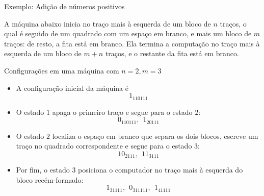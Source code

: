 \begin{frame}[fragile]{Exemplo: Adição de números positivos}

    A máquina abaixo inicia no traço mais à esquerda de um bloco de $n$ traços, o qual é seguido
    de um quadrado com um espaço em branco, e mais um bloco de $m$ traços: de resto, a fita está
    em branco. Ela termina a computação no traço mais à esquerda de um bloco de $m+n$ traços, e 
    o restante da fita está em branco.

    \vspace{0.3in}
    
    \begin{figure}[h]
        \centering
    \end{figure}

\end{frame}

\begin{frame}[fragile]{Configurações em uma máquina com $n=2, m = 3$}

    \begin{itemize}
        \item A configuração inicial da máquina é
        \[
            1_110111
        \]

        \item O estado $1$ apaga o primeiro traço e segue para o estado $2$:
        \[
            0_110111,\ \ 1_20111
        \]

        \item O estado $2$ localiza o espaço em branco que separa os dois blocos, escreve um traço
            no quadrado correspondente e segue para o estado $3$:
        \[
            10_2111,\ \ 11_3111
        \]

        \item Por fim, o estado $3$ posiciona o computador no traço mais à esquerda do bloco
            recém-formado:
        \[
            1_31111,\ \ 0_311111,\ \ 1_41111
        \]
    \end{itemize}

\end{frame}
